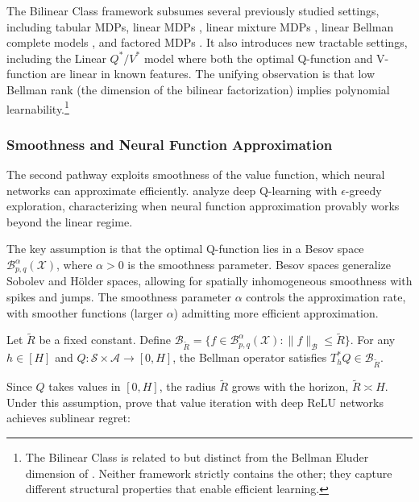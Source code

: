 

The Bilinear Class framework subsumes several previously studied settings, including tabular MDPs, linear MDPs \citep{jin2020}, linear mixture MDPs \citep{AyoubVTR2020}, linear Bellman complete models \citep{zanette2020}, and factored MDPs \citep{kearns1999}. It also introduces new tractable settings, including the Linear $Q^*/V^*$ model where both the optimal Q-function and V-function are linear in known features. The unifying observation is that low Bellman rank (the dimension of the bilinear factorization) implies polynomial learnability.\footnote{The Bilinear Class is related to but distinct from the Bellman Eluder dimension of \citet{jin2021}. Neither framework strictly contains the other; they capture different structural properties that enable efficient learning.}


\subsubsection{Smoothness and Neural Function Approximation}
\label{sec:smoothness_pathway}

The second pathway exploits smoothness of the value function, which neural networks can approximate efficiently. \citet{liu2022deep} analyze deep Q-learning with $\epsilon$-greedy exploration, characterizing when neural function approximation provably works beyond the linear regime.

The key assumption is that the optimal Q-function lies in a Besov space $\mathcal{B}^{\alpha}_{p,q}(\mathcal{X})$, where $\alpha > 0$ is the smoothness parameter. Besov spaces generalize Sobolev and H\"{o}lder spaces, allowing for spatially inhomogeneous smoothness with spikes and jumps. The smoothness parameter $\alpha$ controls the approximation rate, with smoother functions (larger $\alpha$) admitting more efficient approximation.

\begin{assumption}
\label{ass:bellman_smoothness}
Let $\tilde{R}$ be a fixed constant. Define $\mathcal{B}_{\tilde{R}} = \{f \in \mathcal{B}^{\alpha}_{p,q}(\mathcal{X}): \|f\|_{\mathcal{B}} \leq \tilde{R}\}$. For any $h \in [H]$ and $Q: \mathcal{S} \times \mathcal{A} \to [0, H]$, the Bellman operator satisfies $T^*_h Q \in \mathcal{B}_{\tilde{R}}$.
\end{assumption}

Since $Q$ takes values in $[0, H]$, the radius $\tilde{R}$ grows with the horizon, $\tilde{R} \asymp H$. Under this assumption, \citeauthor{liu2022deep} prove that value iteration with deep ReLU networks achieves sublinear regret:

